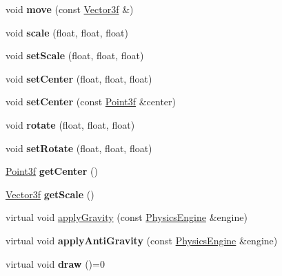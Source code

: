 \begin{DoxyCompactItemize}
\item 
\hypertarget{class_primitive3d_ae8cfaaca6314ea28d051f47d2346ca88}{void {\bfseries move} (const \hyperlink{struct_vector3f}{Vector3f} \&)}\label{class_primitive3d_ae8cfaaca6314ea28d051f47d2346ca88}

\item 
\hypertarget{class_primitive3d_aa6ab662a5b876b415b234be4ca434328}{void {\bfseries scale} (float, float, float)}\label{class_primitive3d_aa6ab662a5b876b415b234be4ca434328}

\item 
\hypertarget{class_primitive3d_acdad88c8f481a91566fd9beba73bbc9c}{void {\bfseries set\-Scale} (float, float, float)}\label{class_primitive3d_acdad88c8f481a91566fd9beba73bbc9c}

\item 
\hypertarget{class_primitive3d_a586c36e8730cfb935a0265f744b92f9f}{void {\bfseries set\-Center} (float, float, float)}\label{class_primitive3d_a586c36e8730cfb935a0265f744b92f9f}

\item 
\hypertarget{class_primitive3d_afc724c7d754bc8a40562dae7c4f8c98a}{void {\bfseries set\-Center} (const \hyperlink{struct_point3f}{Point3f} \&center)}\label{class_primitive3d_afc724c7d754bc8a40562dae7c4f8c98a}

\item 
\hypertarget{class_primitive3d_a5c4d615c1dee7e35b716bf0962732bd7}{void {\bfseries rotate} (float, float, float)}\label{class_primitive3d_a5c4d615c1dee7e35b716bf0962732bd7}

\item 
\hypertarget{class_primitive3d_a2f7451f0fc688cee319e4199e234ca5e}{void {\bfseries set\-Rotate} (float, float, float)}\label{class_primitive3d_a2f7451f0fc688cee319e4199e234ca5e}

\item 
\hypertarget{class_primitive3d_a83404d019bdd8bbfe3f65dae07d90643}{\hyperlink{struct_point3f}{Point3f} {\bfseries get\-Center} ()}\label{class_primitive3d_a83404d019bdd8bbfe3f65dae07d90643}

\item 
\hypertarget{class_primitive3d_a6a0d367a58deb11124973f5cec8c5b0a}{\hyperlink{struct_vector3f}{Vector3f} {\bfseries get\-Scale} ()}\label{class_primitive3d_a6a0d367a58deb11124973f5cec8c5b0a}

\item 
virtual void \hyperlink{class_primitive3d_a554abe0f207ee27040e8800e56a18f5b}{apply\-Gravity} (const \hyperlink{class_physics_engine}{Physics\-Engine} \&engine)
\item 
\hypertarget{class_primitive3d_a7c8ecb08991274e884e54ff476a0abbc}{virtual void {\bfseries apply\-Anti\-Gravity} (const \hyperlink{class_physics_engine}{Physics\-Engine} \&engine)}\label{class_primitive3d_a7c8ecb08991274e884e54ff476a0abbc}

\item 
\hypertarget{class_primitive3d_abe806fcebb63a274f62a45fb50a17aed}{virtual void {\bfseries draw} ()=0}\label{class_primitive3d_abe806fcebb63a274f62a45fb50a17aed}

\end{DoxyCompactItemize}
